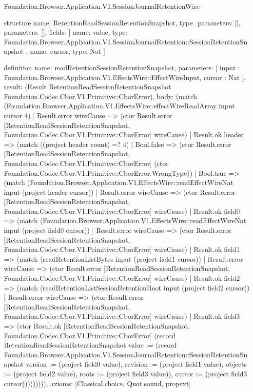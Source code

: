 \begin{lexlean}{Foundation.Browser.Application.V1.SessionJournalRetentionWire}
\begin{semanticmodule}
structure{
  name: RetentionReadSessionRetentionSnapshot,
  type_parameters: [],
  parameters: [],
  fields: [
    {
      name: value,
      type: Foundation.Browser.Application.V1.SessionJournalRetention::SessionRetentionSnapshot
    },
    {name: cursor, type: Nat}
  ]
}

definition{
  name: readRetentionSessionRetentionSnapshot,
  parameters: [
    input : Foundation.Browser.Application.V1.EffectsWire::EffectWireInput,
    cursor : Nat
  ],
  result: (Result RetentionReadSessionRetentionSnapshot Foundation.Codec.Cbor.V1.Primitive::CborError),
  body: (match (Foundation.Browser.Application.V1.EffectsWire::effectWireReadArray input cursor 4)
    | Result.error wireCause => (ctor Result.error [RetentionReadSessionRetentionSnapshot, Foundation.Codec.Cbor.V1.Primitive::CborError] wireCause)
    | Result.ok header => (match ((project header count) =? 4)
      | Bool.false => (ctor Result.error [RetentionReadSessionRetentionSnapshot, Foundation.Codec.Cbor.V1.Primitive::CborError] (ctor Foundation.Codec.Cbor.V1.Primitive::CborError.WrongType))
      | Bool.true => (match (Foundation.Browser.Application.V1.EffectsWire::readEffectWireNat input (project header cursor))
        | Result.error wireCause => (ctor Result.error [RetentionReadSessionRetentionSnapshot, Foundation.Codec.Cbor.V1.Primitive::CborError] wireCause)
        | Result.ok field0 => (match (Foundation.Browser.Application.V1.EffectsWire::readEffectWireNat input (project field0 cursor))
          | Result.error wireCause => (ctor Result.error [RetentionReadSessionRetentionSnapshot, Foundation.Codec.Cbor.V1.Primitive::CborError] wireCause)
          | Result.ok field1 => (match (readRetentionListBytes input (project field1 cursor))
            | Result.error wireCause => (ctor Result.error [RetentionReadSessionRetentionSnapshot, Foundation.Codec.Cbor.V1.Primitive::CborError] wireCause)
            | Result.ok field2 => (match (readRetentionListSessionRetentionRoot input (project field2 cursor))
              | Result.error wireCause => (ctor Result.error [RetentionReadSessionRetentionSnapshot, Foundation.Codec.Cbor.V1.Primitive::CborError] wireCause)
              | Result.ok field3 => (ctor Result.ok [RetentionReadSessionRetentionSnapshot, Foundation.Codec.Cbor.V1.Primitive::CborError] (record RetentionReadSessionRetentionSnapshot {value := (record Foundation.Browser.Application.V1.SessionJournalRetention::SessionRetentionSnapshot {version := (project field0 value), revision := (project field1 value), objects := (project field2 value), roots := (project field3 value)}), cursor := (project field3 cursor)})))))))),
  axioms: [Classical.choice, Quot.sound, propext]
}


\end{semanticmodule}
\end{lexlean}
